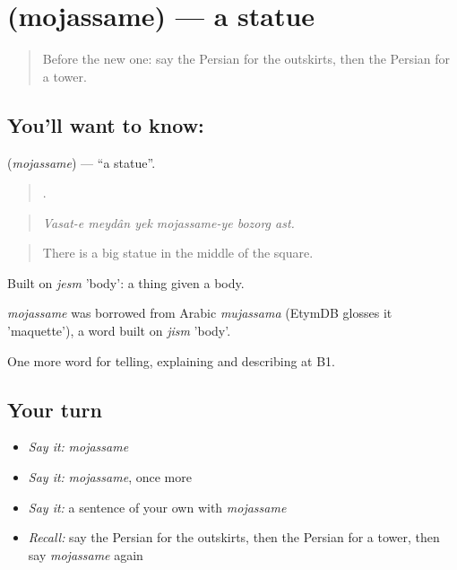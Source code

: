 \section[\texorpdfstring{\fa{مجسمه} (mojassame)}{مجسمه (mojassame)}]{ (mojassame) — a statue}

\label{lesson:FA-C450-mojassame}



\begin{quote}
Before the new one: say the Persian for the outskirts, then the Persian for a tower.
\end{quote}

\subsection*{You'll want to know: }
\textbf{} (\emph{mojassame}) — \textquotedblleft{}a statue\textquotedblright{}.

\begin{quote}
     .
\end{quote}

\begin{quote}
\emph{Vasat-e meydân yek mojassame-ye bozorg ast.}
\end{quote}

\begin{quote}
There is a big statue in the middle of the square.
\end{quote}

Built on \emph{jesm} 'body': a thing given a body.

\begin{cousinweb}
\emph{mojassame} was borrowed from Arabic \emph{mujassama} (EtymDB glosses it 'maquette'), a word built on \emph{jism} 'body'.
\end{cousinweb}

\begin{grammarlens}[title={What you've built}]
One more word for telling, explaining and describing at B1.
\end{grammarlens}

\subsection*{Your turn}
\begin{itemize}
\raggedright
  \item \emph{Say it:} \emph{mojassame}
  \item \emph{Say it:} \emph{mojassame}, once more
  \item \emph{Say it:} a sentence of your own with \emph{mojassame}
  \item \emph{Recall:} say the Persian for the outskirts, then the Persian for a tower, then say \emph{mojassame} again
\end{itemize}

